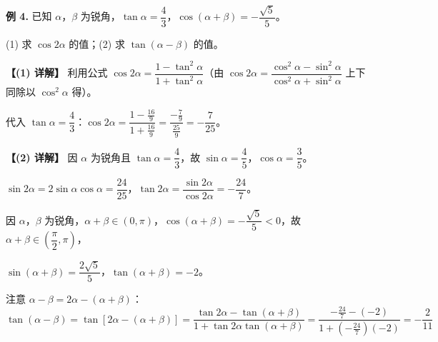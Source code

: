 \documentclass[UTF8,10pt,aspectratio=169]{ctexbeamer}
\begin{document}
	\begin{frame}
		\textbf{例 4.} 已知 $\alpha$，$\beta$ 为锐角，$\tan\alpha = \dfrac{4}{3}$，$\cos(\alpha+\beta) = -\dfrac{\sqrt{5}}{5}$。
		
		(1) 求 $\cos 2\alpha$ 的值；\quad (2) 求 $\tan(\alpha - \beta)$ 的值。
		
		\pause
		\vspace{0.2cm}
		\textbf{【(1) 详解】} 利用公式 $\cos 2\alpha = \dfrac{1-\tan^2\alpha}{1+\tan^2\alpha}$（由 $\cos 2\alpha = \dfrac{\cos^2\alpha - \sin^2\alpha}{\cos^2\alpha + \sin^2\alpha}$ 上下同除以 $\cos^2\alpha$ 得）。
		
		\vspace{0.1cm}
		代入 $\tan\alpha = \dfrac{4}{3}$：$\cos 2\alpha = \dfrac{1 - \frac{16}{9}}{1 + \frac{16}{9}} = \dfrac{-\frac{7}{9}}{\frac{25}{9}} = \boxed{-\dfrac{7}{25}}$。
		
		\pause
		\vspace{0.2cm}
		\textbf{【(2) 详解】} 因 $\alpha$ 为锐角且 $\tan\alpha = \dfrac{4}{3}$，故 $\sin\alpha = \dfrac{4}{5}$，$\cos\alpha = \dfrac{3}{5}$。
		
		\vspace{0.1cm}
		$\sin 2\alpha = 2\sin\alpha\cos\alpha = \dfrac{24}{25}$，$\tan 2\alpha = \dfrac{\sin 2\alpha}{\cos 2\alpha} = -\dfrac{24}{7}$。
		
		\vspace{0.1cm}
		因 $\alpha$，$\beta$ 为锐角，$\alpha + \beta \in (0, \pi)$，$\cos(\alpha+\beta) = -\dfrac{\sqrt{5}}{5} < 0$，故 $\alpha+\beta \in (\dfrac{\pi}{2}, \pi)$，
		
		\vspace{0.1cm}
		$\sin(\alpha+\beta) = \dfrac{2\sqrt{5}}{5}$，$\tan(\alpha+\beta) = -2$。
		
		\vspace{0.1cm}
		注意 $\alpha - \beta = 2\alpha - (\alpha+\beta)$：
		$$\tan(\alpha-\beta) = \tan[2\alpha - (\alpha+\beta)] = \dfrac{\tan 2\alpha - \tan(\alpha+\beta)}{1+\tan 2\alpha\tan(\alpha+\beta)} = \dfrac{-\frac{24}{7}-(-2)}{1+(-\frac{24}{7})(-2)} = \boxed{-\dfrac{2}{11}}$$
	\end{frame}
	
\end{document}
